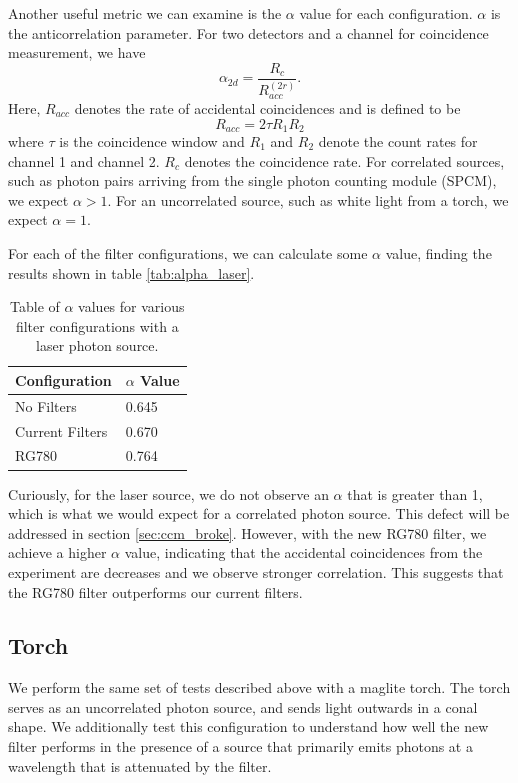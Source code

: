 \documentclass[letterpaper, 11 pt]{article}
\begin{document}
Another useful metric we can examine is the $\alpha$ value for each configuration.
$\alpha$ is the anticorrelation parameter. For two detectors and a channel for coincidence measurement,
we have
\begin{equation}
    \alpha_{2d} = \frac{R_c}{R^{(2r)}_{acc}}.
\end{equation}
Here, $R_{acc}$ denotes the rate of accidental coincidences and is defined to be
\begin{equation}
    R_{acc} = 2\tau R_1 R_2
\end{equation}
where $\tau$ is the coincidence window and $R_1$ and $R_2$ denote the count rates
for channel 1 and channel 2. $R_c$ denotes the coincidence rate. For correlated sources, 
such as photon pairs arriving from the single photon counting module (SPCM), we expect $\alpha > 1$.
For an uncorrelated source, such as white light from a torch, we expect $\alpha = 1$.

For each of the filter configurations, we can calculate some $\alpha$ value, finding the
results shown in table \ref{tab:alpha_laser}.
\begin{table}[H]
    \centering
    \begin{tabular}{|l|l|}
    \hline
    \textbf{Configuration} & \textbf{$\alpha$ Value} \\ \hline
    No Filters             & 0.645                   \\ \hline
    Current Filters        & 0.670                   \\ \hline
    RG780                  & 0.764                   \\ \hline
    \end{tabular}
    \caption{Table of $\alpha$ values for various filter configurations with a laser photon source.}
\end{table}\label{tab:alpha_laser}
Curiously, for the laser source, we do not observe an $\alpha$ that is greater than 1, which is
what we would expect for a correlated photon source. This defect will be addressed in section \ref{sec:ccm_broke}.
However, with the new RG780 filter, we achieve a higher $\alpha$ value, indicating that the accidental coincidences
from the experiment are decreases and we observe stronger correlation. This suggests that the RG780 filter outperforms
our current filters.

\subsection{Torch}
We perform the same set of tests described above with a maglite torch. The torch serves
as an uncorrelated photon source, and sends light outwards in a conal shape. We additionally test
this configuration to understand how well the new filter performs in the presence of a source
that primarily emits photons at a wavelength that is attenuated by the filter.
\end{document}
